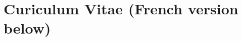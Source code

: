 \documentclass[a4paper, 10pt]{article}
\renewcommand{\_}{\texttt{\char`_}}
\begin{document}

\section{Curiculum Vitae (French version below)}



\pagebreak
\end{document}
